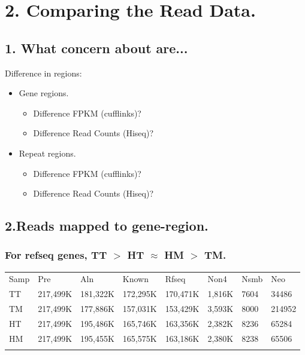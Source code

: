 \section{2. Comparing the Read Data. } 

\subsection{1. What concern about are...}
\begin{frame}[c,fragile]
	\begin{block}{ Difference in regions: }
		\begin{itemize}
			\item Gene regions.
			\begin{itemize}
				\item Difference FPKM (cufflinks)? \\
				\item Difference Read Counts (Hiseq)? \\
			\end{itemize}
			\item Repeat regions.
			\begin{itemize}
				\item Difference FPKM (cufflinks)? \\
				\item Difference Read Counts (Hiseq)? \\
			\end{itemize}
		\end{itemize}
	\end{block}
\end{frame}


\subsection{2.Reads mapped to gene-region.}

\begin{frame}[c,fragile]
	\frametitle{ For refseq genes, TT $>$ HT $\approx$ HM $>$ TM. }
		\tiny{
			\begin{table}
			\centering
			\begin{tabular}{  C{0.4cm}  C{1.3cm}  C{1.3cm}  C{1.3cm}  C{1.3cm} C{1.0cm} C{0.75cm} C{0.75cm} }
			\hline\noalign{\smallskip}
			Samp & Pre & Aln & Known & Rfseq & Non4 & Nsmb & Neo \\
			\noalign{\smallskip}\hline\noalign{\smallskip}			
			TT &	217,499K & 181,322K & 172,295K & 170,471K & 1,816K & 7604 & 34486	 \\
			TM &	217,499K & 177,886K & 157,031K & 153,429K & 3,593K & 8000 & 214952  \\
			HT &	217,499K & 195,486K & 165,746K & 163,356K & 2,382K & 8236 & 65284	 \\
			HM &	217,499K & 195,455K & 165,575K & 163,186K & 2,380K & 8238 & 65506	 \\
			\noalign{\smallskip}\hline  		\\
			\end{tabular}
			\end{table}
		}
	
\end{frame}



